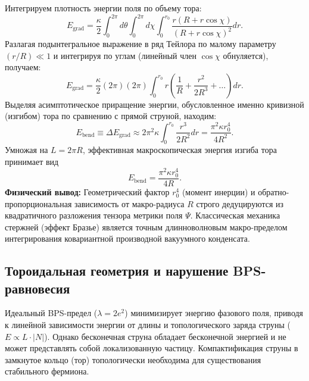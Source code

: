 \documentclass[11pt,a4paper]{article}
\begin{document}
Интегрируем плотность энергии поля по объему тора:
\begin{equation}
	E_{\text{grad}} = \frac{\kappa}{2} \int_0^{2\pi} d\theta \int_0^{2\pi} d\chi \int_0^{r_0} \frac{r(R + r\cos\chi)}{(R + r\cos\chi)^2} dr.
\end{equation}
Разлагая подынтегральное выражение в ряд Тейлора по малому параметру $(r/R) \ll 1$ и интегрируя по углам (линейный член $\cos\chi$ обнуляется), получаем:
\begin{equation}
	E_{\text{grad}} = \frac{\kappa}{2} (2\pi) (2\pi) \int_0^{r_0} r \left( \frac{1}{R} + \frac{r^2}{2R^3} + \dots \right) dr.
\end{equation}
Выделяя асимптотическое приращение энергии, обусловленное именно кривизной (изгибом) тора по сравнению с прямой струной, находим:
\begin{equation}
	E_{\text{bend}} \equiv \Delta E_{\text{grad}} \approx 2\pi^2 \kappa \int_0^{r_0} \frac{r^3}{2R^2} dr = \frac{\pi^2 \kappa r_0^4}{4 R^2}.
	\label{eq:field_to_mechanics}
\end{equation}
Умножая на $L = 2\pi R$, эффективная макроскопическая энергия изгиба тора принимает вид 
\begin{equation}
	E_{\text{bend}} = \frac{\pi^2 \kappa r_0^4}{4R}.
\end{equation}
\textbf{Физический вывод:} Геометрический фактор $r_0^4$ (момент инерции) и обратно-пропорциональная зависимость от макро-радиуса $R$ строго дедуцируются из квадратичного разложения тензора метрики поля $\Psi$. Классическая механика стержней (эффект Бразье) является точным длинноволновым макро-пределом интегрирования ковариантной производной вакуумного конденсата.
	
\subsection{Тороидальная геометрия и нарушение BPS-равновесия}
Идеальный BPS-предел ($\lambda = 2e^2$) минимизирует энергию фазового поля, приводя к линейной зависимости энергии от длины и топологического заряда струны ($E \propto L \cdot |N|$). Однако бесконечная струна обладает бесконечной энергией и не может представлять собой локализованную частицу. Компактификация струны в замкнутое кольцо (тор) топологически необходима для существования стабильного фермиона.
	
\end{document}

